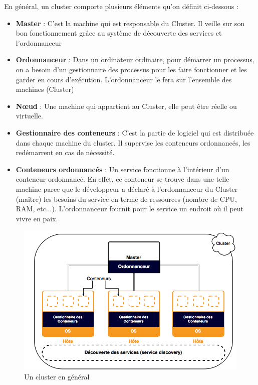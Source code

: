 \begin{onehalfspace}
{\begin{center}
\begin{table}[H]
\end{table}
\end{center}
}


En général, un cluster comporte plusieurs éléments qu'on définit ci-dessous :

\begin{itemize}
	\item \textbf{Master} : C'est la machine qui est responsable du Cluster. Il veille sur son bon fonctionnement grâce au système de découverte des services et l'ordonnanceur
	\item \textbf{Ordonnanceur} : Dans un ordinateur ordinaire, pour démarrer un processus, on a besoin d'un gestionnaire des processus pour les faire fonctionner et les garder en cours d'exécution. L'ordonnanceur le fera sur l'ensemble des machines (Cluster)
	\item \textbf{Nœud} : Une machine qui appartient au Cluster, elle peut être réelle ou virtuelle.
	\item \textbf{Gestionnaire des conteneurs} : C'est la partie de logiciel qui est distribuée dans chaque machine du cluster. Il supervise les conteneurs ordonnancés, les redémarrent en cas de nécessité.
	\item \textbf{Conteneurs ordonnancés} : Un service fonctionne à l'intérieur d'un conteneur ordonnancé. En effet, ce conteneur se trouve dans une telle machine  parce que le développeur a déclaré à l'ordonnanceur du Cluster (maître) les besoins du service en terme de ressources (nombre de CPU, RAM, etc...). L'ordonnanceur fournit pour le service un endroit où il peut vivre en paix.
\end{itemize}


\begin{figure}[H]
\centering
\includegraphics [scale=0.55]{chapitre3/assets/cluster}
\caption{Un cluster en général}
\label{fig:}
\end{figure}


\end{onehalfspace}
